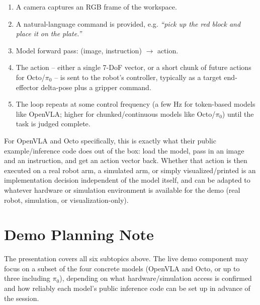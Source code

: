 \documentclass[a4paper,11pt]{article}
\begin{document}
\begin{enumerate}
	\item A camera captures an RGB frame of the workspace.
	\item A natural-language command is provided, e.g. \textit{``pick up the red block and place it on the plate.''}
	\item Model forward pass: (image, instruction) $\rightarrow$ action.
	\item The action -- either a single 7-DoF vector, or a short chunk of future actions for Octo/$\pi_0$ -- is sent to the robot's controller, typically as a target end-effector delta-pose plus a gripper command.
	\item The loop repeats at some control frequency (a few Hz for token-based models like OpenVLA; higher for chunked/continuous models like Octo/$\pi_0$) until the task is judged complete.
\end{enumerate}

For OpenVLA and Octo specifically, this is exactly what their public example/inference code does out of the box: load the model, pass in an image and an instruction, and get an action vector back. Whether that action is then executed on a real robot arm, a simulated arm, or simply visualized/printed is an implementation decision independent of the model itself, and can be adapted to whatever hardware or simulation environment is available for the demo (real robot, simulation, or visualization-only).

\section{Demo Planning Note}

The presentation covers all six subtopics above. The live demo component may focus on a subset of the four concrete models (OpenVLA and Octo, or up to three including $\pi_0$), depending on what hardware/simulation access is confirmed and how reliably each model's public inference code can be set up in advance of the session.
\end{document}
